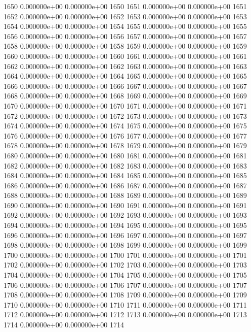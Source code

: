 \documentclass{article}
\begin{document}
\begin{Schunk}
\begin{Soutput}
1650   0.000000e+00   0.000000e+00 1650
1651   0.000000e+00   0.000000e+00 1651
1652   0.000000e+00   0.000000e+00 1652
1653   0.000000e+00   0.000000e+00 1653
1654   0.000000e+00   0.000000e+00 1654
1655   0.000000e+00   0.000000e+00 1655
1656   0.000000e+00   0.000000e+00 1656
1657   0.000000e+00   0.000000e+00 1657
1658   0.000000e+00   0.000000e+00 1658
1659   0.000000e+00   0.000000e+00 1659
1660   0.000000e+00   0.000000e+00 1660
1661   0.000000e+00   0.000000e+00 1661
1662   0.000000e+00   0.000000e+00 1662
1663   0.000000e+00   0.000000e+00 1663
1664   0.000000e+00   0.000000e+00 1664
1665   0.000000e+00   0.000000e+00 1665
1666   0.000000e+00   0.000000e+00 1666
1667   0.000000e+00   0.000000e+00 1667
1668   0.000000e+00   0.000000e+00 1668
1669   0.000000e+00   0.000000e+00 1669
1670   0.000000e+00   0.000000e+00 1670
1671   0.000000e+00   0.000000e+00 1671
1672   0.000000e+00   0.000000e+00 1672
1673   0.000000e+00   0.000000e+00 1673
1674   0.000000e+00   0.000000e+00 1674
1675   0.000000e+00   0.000000e+00 1675
1676   0.000000e+00   0.000000e+00 1676
1677   0.000000e+00   0.000000e+00 1677
1678   0.000000e+00   0.000000e+00 1678
1679   0.000000e+00   0.000000e+00 1679
1680   0.000000e+00   0.000000e+00 1680
1681   0.000000e+00   0.000000e+00 1681
1682   0.000000e+00   0.000000e+00 1682
1683   0.000000e+00   0.000000e+00 1683
1684   0.000000e+00   0.000000e+00 1684
1685   0.000000e+00   0.000000e+00 1685
1686   0.000000e+00   0.000000e+00 1686
1687   0.000000e+00   0.000000e+00 1687
1688   0.000000e+00   0.000000e+00 1688
1689   0.000000e+00   0.000000e+00 1689
1690   0.000000e+00   0.000000e+00 1690
1691   0.000000e+00   0.000000e+00 1691
1692   0.000000e+00   0.000000e+00 1692
1693   0.000000e+00   0.000000e+00 1693
1694   0.000000e+00   0.000000e+00 1694
1695   0.000000e+00   0.000000e+00 1695
1696   0.000000e+00   0.000000e+00 1696
1697   0.000000e+00   0.000000e+00 1697
1698   0.000000e+00   0.000000e+00 1698
1699   0.000000e+00   0.000000e+00 1699
1700   0.000000e+00   0.000000e+00 1700
1701   0.000000e+00   0.000000e+00 1701
1702   0.000000e+00   0.000000e+00 1702
1703   0.000000e+00   0.000000e+00 1703
1704   0.000000e+00   0.000000e+00 1704
1705   0.000000e+00   0.000000e+00 1705
1706   0.000000e+00   0.000000e+00 1706
1707   0.000000e+00   0.000000e+00 1707
1708   0.000000e+00   0.000000e+00 1708
1709   0.000000e+00   0.000000e+00 1709
1710   0.000000e+00   0.000000e+00 1710
1711   0.000000e+00   0.000000e+00 1711
1712   0.000000e+00   0.000000e+00 1712
1713   0.000000e+00   0.000000e+00 1713
1714   0.000000e+00   0.000000e+00 1714

\end{Soutput}
\end{Schunk}
\end{document}
